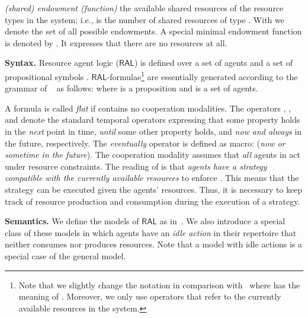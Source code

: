 \documentclass{llncs}
\newcommand{\ral}{\ensuremath{\mathsf{RAL}}\xspace}
\begin{document}
  \emph{(shared) endowment (function)} 
 the available shared resources of the resource types   in the system; i.e.,  is the number of shared resources of type .  With  we denote the set of all possible endowments.  A special minimal endowment function is denoted by . It expresses that there are no resources at all. 


\textbf{Syntax.} Resource agent logic (\ral) is defined over a set of agents  and a set of propositional symbols .  
\ral-formulae\footnote{Note that we slightly change the notation in comparison with~\cite{Bulling/Farwer:10a} where  has the meaning of . Moreover, we only use operators that refer to the currently available resources in the system.}
are essentially generated according to the grammar of ~\cite{Alur//:02a} 
as follows:  
where  is a proposition and  is a set of agents. 
        
        A formula   is called \emph{flat} if  contains no  cooperation modalities. The operators , , and  denote the standard temporal operators expressing that some property holds in the \emph{next} point in time,  \emph{until} some other property holds, and \emph{now and always} in the future, respectively.  The \emph{eventually} operator is defined as macro:  (\emph{now or sometime in the future}).  
The  cooperation modality    assumes that \emph{all} agents  in \Agents act under resource constraints. The reading of  is that
           \emph{agents  have a strategy compatible with the currently available resources} to enforce . 
This  means that the strategy can be executed given the agents' resources. Thus, it is necessary to keep track of resource production and consumption during the execution of a strategy. 



           
\textbf{Semantics.} We define the models of \ral as in~\cite{Bulling15ral-IJCAI}. We also introduce a special class of these models in which agents have an \emph{idle action} in their repertoire that neither consumes nor produces resources. Note that a model with idle actions is a special case of the general model.
           
\end{document}
